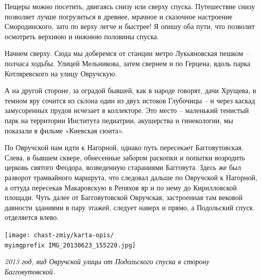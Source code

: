 Пещеры можно посетить, двигаясь снизу или сверху спуска. Путешествие снизу позволяет лучше погрузиться в древнее, мрачное и сказочное настроение Смородинского, зато по верху легче и быстрее! Я опишу оба пути, что позволит осмотреть верхнюю и нижнюю половины спуска.

Начнем сверху. Сюда мы доберемся от станции метро Лукьяновская пешком – полчаса ходьбы. Улицей Мельникова, затем свернем и по Герцена, вдоль парка Котляревского на улицу Овручскую. 


А на другой стороне, за оградой бывшей, как в народе говорят, дачи Хрущева, в темном яру сочится из склона один из двух истоков Глубочицы – и через каскад замусоренных прудов исчезает в коллекторе. Это место – маленький тенистый парк на территории Института педиатрии, акушерства и гинекологии, мы показали в фильме «Киевская сюита». 





По Овручской нам идти к Нагорной, однако путь  пересекает Багговутовская. Слева, в бывшем сквере, обнесенные забором раскопки и попытки возродить церковь святого Феодора, возведенную стараниями Багговута. Здесь же был разворот трамвайного маршрута, что следовал дальше по Овручской к Нагорной, а оттуда пересекая Макаровскую в Репяхов яр и по нему до Кирилловской площади. Чуть далее от Багговутовской Овручская, застроенная там вековой давности зданиями в пару этажей, следует наверх и прямо, а Подольский спуск отделяется влево. 

\begin{center}
\texttt{[image: chast-zmiy/karta-opis/\\myimgprefix IMG\_20130623\_155220.jpg]}

\textit{2013 год, вид Овручской улицы от Подольского спуска в сторону Багговутовской.}
\end{center}

